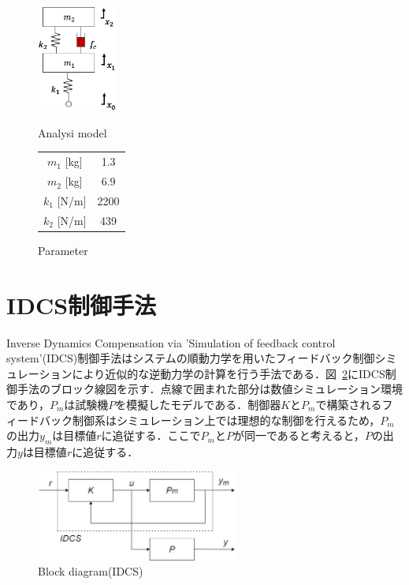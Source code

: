 \documentclass{article_vdlab_sotsuron_youshi}
\begin{document}
\begin{figure}[H]
  \begin{minipage}{0.5\hsize}
    \begin{center}
      \includegraphics[height=35mm]{figure/analysis_model.eps}
      \caption{Analysi model}
    \label{fig:analysis_model}
    \end{center}
  \end{minipage}
  \begin{minipage}{0.45\hsize}
      \begin{center}
	\makeatletter
	\def\@captype{table}
	\makeatother
	\caption{Parameter}
	\label{tab:analysis_parameter}
	  \begin{tabular}{cc}\hline
	    $m_1$ [kg] & 1.3\\
	    $m_2$ [kg] & 6.9\\
	    $k_1$ [N/m] & 2200\\
	    $k_2$ [N/m] & 439\\\hline
	  \end{tabular}
      \end{center}
  \end{minipage}
\end{figure}

\newpage
\section{IDCS制御手法}
Inverse Dynamics Compensation via 'Simulation of feedback control system'(IDCS)制御手法はシステムの順動力学を用いたフィードバック制御シミュレーションにより近似的な逆動力学の計算を行う手法である\cite{method_idcs}．図~\ref{fig:idcs_block}にIDCS制御手法のブロック線図を示す．点線で囲まれた部分は数値シミュレーション環境であり，$P_m$は試験機$P$を模擬したモデルである．制御器$K$と$P_m$で構築されるフィードバック制御系はシミュレーション上では理想的な制御を行えるため，$P_m$の出力$y_m$は目標値$r$に追従する．ここで$P_m$と$P$が同一であると考えると，$P$の出力$y$は目標値$r$に追従する．

\vspace*{2mm}
\begin{figure}[htp]
  \begin{center}
    \includegraphics[height=30mm]{figure/idcs_block.eps}
    \vspace*{1mm}
    \caption{Block diagram(IDCS)}
    \label{fig:idcs_block}
  \end{center}
\end{figure}
\end{document}
